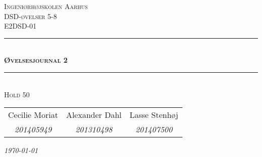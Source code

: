 
		\newcommand{\HRule}{\rule{\linewidth}{0.1mm}} %
		
		\begin{center}
			
			\textsc{\LARGE Ingeniørhøjskolen Aarhus}\\[1.5cm] %
			\textsc{\Large DSD-øvelser 5-8}\\[1.0cm] 
			\textsc{\large E2DSD-01}\\[2.5cm] 
			\HRule \\[0.8cm]
			{\huge \bfseries \textsc{Øvelsesjournal 2}}\\[0.4cm]
			\HRule \\[1.5cm]
			
			\textsc{\large Hold 50}\\
			\vspace{0.5 in}
			\begin{tabular}{ c c c }
				Cecilie Moriat & Alexander Dahl & Lasse Stenhøj \\
				\textsl{201405949} & \textsl{201310498} & \textsl{201407500}
			\end{tabular}
			
			\vspace{2.5 in}
			
			{\large\textit{\today}} \\[3cm]
			\vfill %
		\end{center} %
